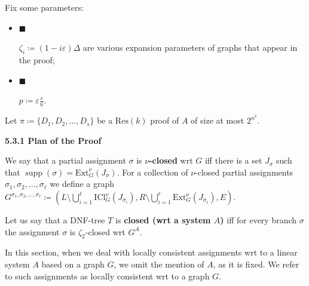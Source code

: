 Fix some parameters:\par


\begin{itemize}


\item[] 
$\blacksquare$ 


$\zeta_{i}\coloneqq(1-i\varepsilon)\Delta$ are various expansion parameters of graphs that
appear in the proof;\par





\item[] 
$\blacksquare$ 


$p\coloneqq\varepsilon\frac{r}{n}$.\par





\end{itemize}




Let $\pi\coloneqq\{D_{1},D_{2},\dots,D_{s}\}$ be a $\mathrm{Res}(k)$ proof of $A$ of size at most $2^{n^{\delta}}$.\par




\par\medskip\noindent\textbf{
5.3.1 Plan of the Proof}\par




We say that a partial assignment $\sigma$ is $\nu$\textbf{-closed} wrt $G$ iff there is a set
$J_{\sigma}$ such that $\operatorname*{supp}(\sigma)=\mathrm{Ext}_{G}^{\nu}\left(J_{\sigma}\right)$. For a collection of $\nu$-closed
partial assignments $\sigma_{1},\sigma_{2},\dots,\sigma_{\ell}$ we define a graph
$G^{\sigma_{1},\sigma_{2},\dots,\sigma_{\ell}}\coloneqq(L\setminus\bigcup%
\limits_{i=1}^{\ell}\mathrm{ICl}_{G}^{\nu}\left(J_{\sigma_{i}}\right),R%
\setminus\bigcup\limits_{i=1}^{\ell}\mathrm{Ext}_{G}^{\nu}\left(J_{\sigma_{i}}%
\right),E)$.\par




Let us say that a DNF-tree $T$ is \textbf{closed (wrt a system $A$)} iff for every branch $\sigma$ the
assignment $\sigma$ is $\zeta_{2}$-closed wrt $G^{A}$.\par




In this section, when we deal with locally consistent assignments wrt to a linear system $A$ based on
a graph $G$, we omit the mention of $A$, as it is fixed. We refer to such assignments as
locally consistent wrt to a graph $G$.\par




